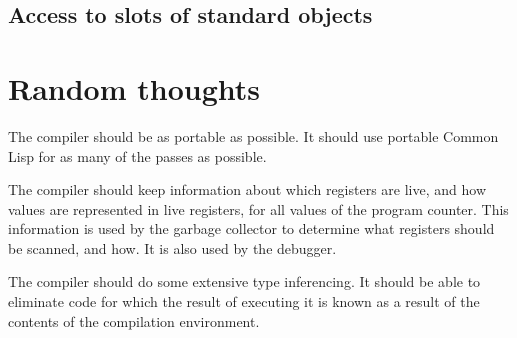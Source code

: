 \subsection{Access to slots of standard objects}

\section{Random thoughts}

The compiler should be as portable as possible.  It should use
portable Common Lisp for as many of the passes as possible.  

The compiler should keep information about which registers are live,
and how values are represented in live registers, for all values of
the program counter.  This information is used by the garbage
collector to determine what registers should be scanned, and how.   It
is also used by the debugger.  

The compiler should do some extensive type inferencing.  It should be
able to eliminate code for which the result of executing it is known
as a result of the contents of the compilation environment.  



